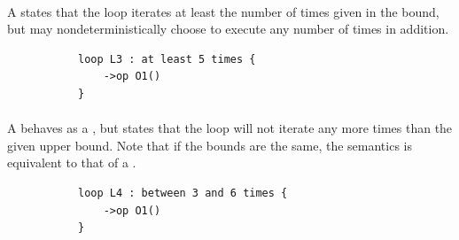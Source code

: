 \paragraph{\mlowerloopbound}
A \mlowerloopbound{} states that the loop iterates at least the
number of times given in the bound, but may nondeterministically
choose to execute any number of times in addition.

\begin{figure}[h!]
\begin{subfigure}[t]{\egtextwidth}
\begin{lstlisting}[style=Example]
loop L3 : at least 5 times {
    ->op O1()
}
\end{lstlisting}
\end{subfigure}
\hfill
\begin{subfigure}[t]{\eggraphicalwidth}
  \gsecaption
  \centering
\end{subfigure}
\end{figure}

\paragraph{\mrangeloopbound}
A \mrangeloopbound{} behaves as a \mlowerloopbound, but states that
the loop will not iterate any more times than the given upper bound.
Note that if the bounds are the same, the semantics is equivalent
to that of a \mdefiniteloopbound{}.

\begin{figure}[H]
\begin{subfigure}[t]{\egtextwidth}
\begin{lstlisting}[style=Example]
loop L4 : between 3 and 6 times {
    ->op O1()
}
\end{lstlisting}
\end{subfigure}
\hfill
\begin{subfigure}[t]{\eggraphicalwidth}
  \gsecaption
  \centering
\end{subfigure}
\end{figure}

\subsection{\mactionstep}\label{ssec:metamodel-steps-actions}

